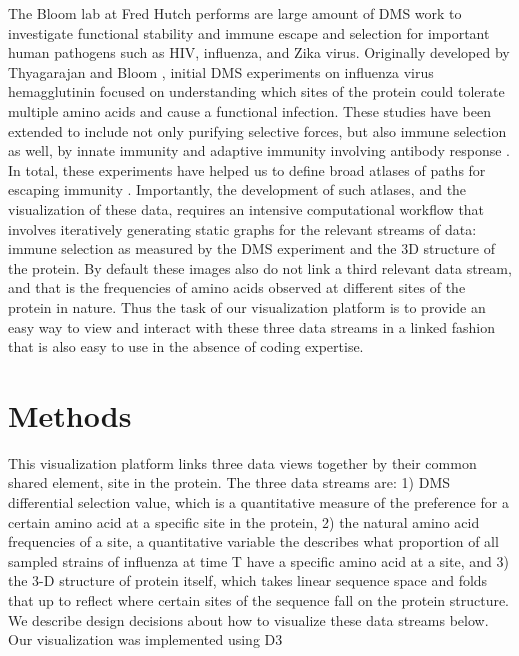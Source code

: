 \documentclass[sigchi]{acmart}
\begin{document}
The Bloom lab at Fred Hutch performs are large amount of DMS work to investigate functional stability and immune escape and selection for important human pathogens such as HIV, influenza, and Zika virus. Originally developed by Thyagarajan and Bloom \cite{thyagarajan2014inherent}, initial DMS experiments on influenza virus hemagglutinin focused on understanding which sites of the protein could tolerate multiple amino acids and cause a functional infection. These studies have been extended to include not only purifying selective forces, but also immune selection as well, by innate immunity \cite{ashenberg2017deep} and adaptive immunity involving antibody response \cite{Lee2018}. In total, these experiments have helped us to define broad atlases of paths for escaping immunity \cite{dingens2019antigenic}. Importantly, the development of such atlases, and the visualization of these data, requires an intensive computational workflow that involves iteratively generating static graphs for the relevant streams of data: immune selection as measured by the DMS experiment and the 3D structure of the protein. By default these images also do not link a third relevant data stream, and that is the frequencies of amino acids observed at different sites of the protein in nature. Thus the task of our visualization platform is to provide an easy way to view and interact with these three data streams in a linked fashion that is also easy to use in the absence of coding expertise.

\section{Methods}

This visualization platform links three data views together by their common shared element, site in the protein. The three data streams are: 1) DMS differential selection value, which is a quantitative measure of the preference for a certain amino acid at a specific site in the protein, 2) the natural amino acid frequencies of a site, a quantitative variable the describes what proportion of all sampled strains of influenza at time T have a specific amino acid at a site, and 3) the 3-D structure of protein itself, which takes linear sequence space and folds that up to reflect where certain sites of the sequence fall on the protein structure. We describe design decisions about how to visualize these data streams below. Our visualization was implemented using D3 \cite{bostock2011d3}
\end{document}
